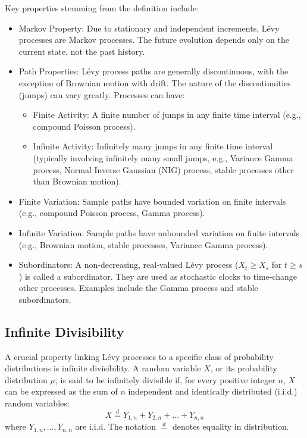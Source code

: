 \documentclass[11pt,twoside,openright]{report}
\begin{document}
Key properties stemming from the definition include:
\begin{itemize}
    \item Markov Property: Due to stationary and independent increments, Lévy processes are Markov processes. The future evolution depends only on the current state, not the past history.
    \item Path Properties: Lévy process paths are generally discontinuous, with the exception of Brownian motion with drift. The nature of the discontinuities (jumps) can vary greatly. Processes can have:
        \begin{itemize}
            \item Finite Activity: A finite number of jumps in any finite time interval (e.g., compound Poisson process).
            \item Infinite Activity: Infinitely many jumps in any finite time interval (typically involving infinitely many small jumps, e.g., Variance Gamma process, Normal Inverse Gaussian (NIG) process, stable processes other than Brownian motion).
        \end{itemize}
    \item Finite Variation: Sample paths have bounded variation on finite intervals (e.g., compound Poisson process, Gamma process).
    \item Infinite Variation: Sample paths have unbounded variation on finite intervals (e.g., Brownian motion, stable processes, Variance Gamma process).
    \item Subordinators: A non-decreasing, real-valued Lévy process ($X_t \ge X_s$ for $t \ge s$) is called a subordinator. They are used as stochastic clocks to time-change other processes. Examples include the Gamma process and stable subordinators.
\end{itemize}

\subsection{Infinite Divisibility}
\label{subsec:infinite_divisibility}

A crucial property linking Lévy processes to a specific class of probability distributions is infinite divisibility. A random variable $X$, or its probability distribution $\mu$, is said to be infinitely divisible if, for every positive integer $n$, $X$ can be expressed as the sum of $n$ independent and identically distributed (i.i.d.) random variables:
\[ X \overset{d}{=} Y_{1,n} + Y_{2,n} + \dots + Y_{n,n} \]
where $Y_{1,n}, \dots, Y_{n,n}$ are i.i.d. The notation $\overset{d}{=}$ denotes equality in distribution.
\end{document}
